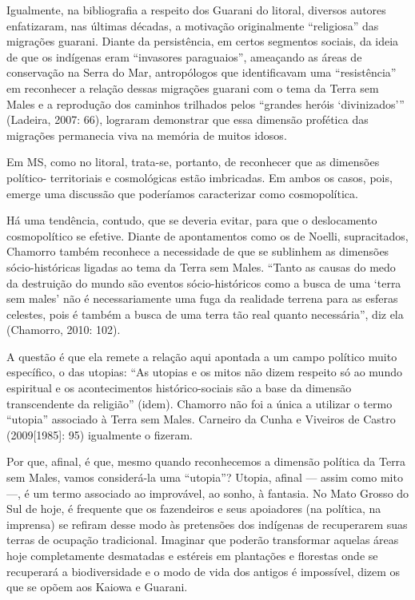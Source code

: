 \documentclass{article}
\begin{document}
Igualmente, na bibliografia a respeito dos Guarani do litoral, diversos
autores enfatizaram, nas \'ultimas d\'ecadas, a motiva\c{c}\~ao
originalmente {\textquotedblleft}religiosa{\textquotedblright} das
migra\c{c}\~oes guarani. Diante da persist\^encia, em certos segmentos
sociais, da ideia de que os ind\'igenas eram
{\textquotedblleft}invasores paraguaios{\textquotedblright},
amea\c{c}ando as \'areas de conserva\c{c}\~ao na Serra do Mar,
antrop\'ologos que identificavam uma
{\textquotedblleft}resist\^encia{\textquotedblright} em reconhecer a
rela\c{c}\~ao dessas migra\c{c}\~oes guarani com o tema da Terra sem
Males e a reprodu\c{c}\~ao dos caminhos trilhados pelos
{\textquotedblleft}grandes her\'ois
{\textquoteleft}divinizados{\textquoteright}{\textquotedblright}
(Ladeira, 2007: 66), lograram demonstrar que essa dimens\~ao
prof\'etica das migra\c{c}\~oes permanecia viva na mem\'oria de muitos
idosos. 

Em MS, como no litoral, trata-se, portanto, de reconhecer que as
dimens\~oes pol\'itico- territoriais e cosmol\'ogicas est\~ao
imbricadas. Em ambos os casos, pois, emerge uma discuss\~ao que
poder\'iamos caracterizar como cosmopol\'itica.

H\'a uma tend\^encia, contudo, que se deveria evitar, para que o
deslocamento cosmopol\'itico se efetive. Diante de apontamentos como os
de Noelli, supracitados, Chamorro tamb\'em reconhece a necessidade de
que se sublinhem as dimens\~oes s\'ocio-hist\'oricas ligadas ao tema da
Terra sem Males. {\textquotedblleft}Tanto as causas do medo da
destrui\c{c}\~ao do mundo s\~ao eventos s\'ocio-hist\'oricos como a
busca de uma {\textquoteleft}terra sem males{\textquoteright} n\~ao \'e
necessariamente uma fuga da realidade terrena para as esferas celestes,
pois \'e tamb\'em a busca de uma terra t\~ao real quanto
necess\'aria{\textquotedblright}, diz ela (Chamorro, 2010: 102). 

A quest\~ao \'e que ela remete a rela\c{c}\~ao aqui apontada a um campo
pol\'itico muito espec\'ifico, o das utopias: {\textquotedblleft}As
utopias e os mitos n\~ao dizem respeito s\'o ao mundo espiritual e os
acontecimentos hist\'orico-sociais s\~ao a base da dimens\~ao
transcendente da religi\~ao{\textquotedblright} (idem). Chamorro n\~ao
foi a \'unica a utilizar o termo
{\textquotedblleft}utopia{\textquotedblright} associado \`a Terra sem
Males. Carneiro da Cunha e Viveiros de Castro (2009[1985]: 95)
igualmente o fizeram. 

Por que, afinal, \'e que, mesmo quando reconhecemos a dimens\~ao
pol\'itica da Terra sem Males, vamos consider\'a-la uma
{\textquotedblleft}utopia{\textquotedblright}? Utopia, afinal --- assim
como mito ---, \'e um termo associado ao improv\'avel, ao sonho, \`a
fantasia. No Mato Grosso do Sul de hoje, \'e frequente que os
fazendeiros e seus apoiadores (na pol\'itica, na imprensa) se refiram
desse modo \`as pretens\~oes dos ind\'igenas de recuperarem suas terras
de ocupa\c{c}\~ao tradicional. Imaginar que poder\~ao transformar
aquelas \'areas hoje completamente desmatadas e est\'ereis em
planta\c{c}\~oes e florestas onde se recuperar\'a a biodiversidade e o
modo de vida dos antigos \'e imposs\'ivel, dizem os que se op\~oem aos
Kaiowa e Guarani.
\end{document}
